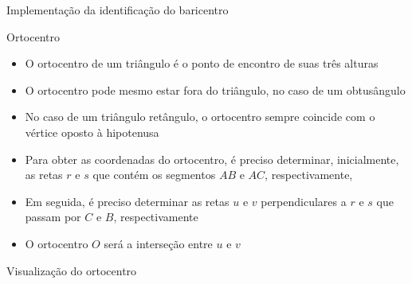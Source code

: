 \begin{frame}[fragile]{Implementação da identificação do baricentro}
\end{frame}

\begin{frame}[fragile]{Ortocentro}

    \begin{itemize}
        \item O ortocentro de um triângulo é o ponto de encontro de suas três alturas

        \item O ortocentro pode mesmo estar fora do triângulo, no caso de um obtusângulo

        \item No caso de um triângulo retângulo, o ortocentro sempre coincide com o vértice 
            oposto à hipotenusa

        \item Para obter as coordenadas do ortocentro, é preciso determinar, inicialmente,
            as retas $r$ e $s$ que contém os segmentos $AB$ e $AC$,
            respectivamente,

        \item Em seguida, é preciso determinar as retas $u$ e $v$ perpendiculares a 
            $r$ e $s$ que passam por $C$ e $B$, respectivamente

        \item O ortocentro $O$ será a interseção entre $u$ e $v$
    \end{itemize}

\end{frame}

\begin{frame}[fragile]{Visualização do ortocentro}

    \begin{figure}
        \centering

    \end{figure}

\end{frame}


